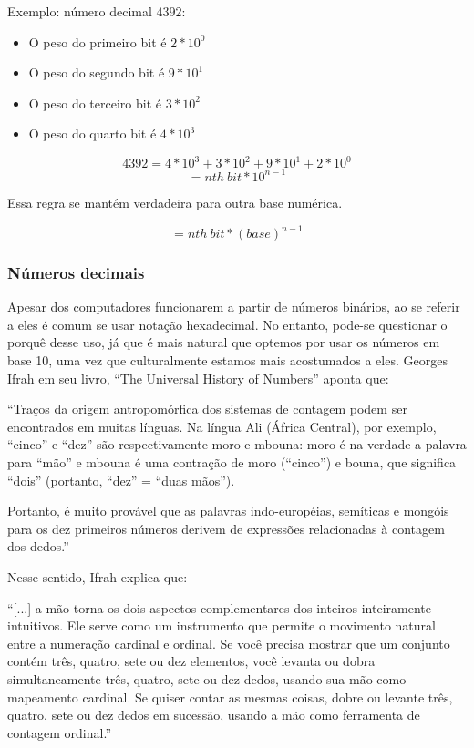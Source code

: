 Exemplo: número decimal $4392$:
\begin{itemize}
  \item O peso do primeiro bit é $2 * 10^0$
  \item O peso do segundo bit é $9 * 10^1$
  \item O peso do terceiro bit é $3 * 10^2$
  \item O peso do quarto bit é $4 * 10^3$
\end{itemize}
\[ 4392 = 4*10^3 + 3*10^2 + 9*10^1 + 2*10^0\]
\[= nth\: bit * 10^{n-1}\]

Essa regra se mantém verdadeira para outra base numérica.

\[= nth\: bit * (base)^{n-1}\]

\subsubsection{Números decimais}

Apesar dos computadores funcionarem a partir de números binários, ao se referir a eles é comum se usar notação hexadecimal. No entanto, pode-se questionar o porquê desse uso, já que é mais natural que optemos por usar os números em base 10, uma vez que culturalmente estamos mais acostumados a eles. Georges Ifrah em seu livro, ``The Universal History of Numbers'' \cite{14} aponta que:

``Traços da origem antropomórfica dos sistemas de contagem podem ser encontrados em muitas línguas. Na língua Ali (África Central), por exemplo, ``cinco'' e ``dez'' são respectivamente moro e mbouna: moro é na verdade a palavra para ``mão'' e mbouna é uma contração de moro (``cinco'') e bouna, que significa ``dois'' (portanto, ``dez'' = ``duas mãos'').

Portanto, é muito provável que as palavras indo-européias, semíticas e mongóis para os dez primeiros números derivem de expressões relacionadas à contagem dos dedos.''

Nesse sentido, Ifrah explica que:

``[...] a mão torna os dois aspectos complementares dos inteiros inteiramente intuitivos. Ele serve como um instrumento que permite o movimento natural entre a numeração cardinal e ordinal. Se você precisa mostrar que um conjunto contém três, quatro, sete ou dez elementos, você levanta ou dobra simultaneamente três, quatro, sete ou dez dedos, usando sua mão como mapeamento cardinal. Se quiser contar as mesmas coisas, dobre ou levante três, quatro, sete ou dez dedos em sucessão, usando a mão como ferramenta de contagem ordinal.''

